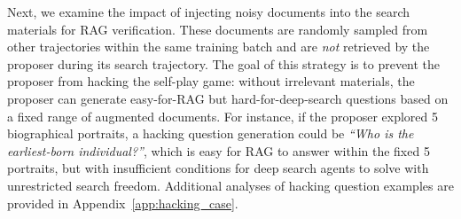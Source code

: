 \documentclass[10pt, a4paper, logo]{googledeepmind} %
\newcommand{\pengyu}[1]{{\color{blue}{[\bf\sf Pengyu: #1]}}}
\begin{document}
Next, we examine the impact of injecting noisy documents into the search materials for RAG verification. These documents are randomly sampled from other trajectories within the same training batch and are \emph{not} retrieved by the proposer during its search trajectory. The goal of this strategy is to prevent the proposer from hacking the self-play game: without irrelevant materials, the proposer can generate easy-for-RAG but hard-for-deep-search questions based on a fixed range of augmented documents. For instance, if the proposer explored 5 biographical portraits, a hacking question generation could be \textit{``Who is the earliest-born individual?''}, which is easy for RAG to answer within the fixed 5 portraits, but with insufficient conditions for deep search agents to solve with unrestricted search freedom. Additional analyses of hacking question examples are provided in Appendix~\ref{app:hacking_case}.  
%
%
%
%
%
\end{document}
